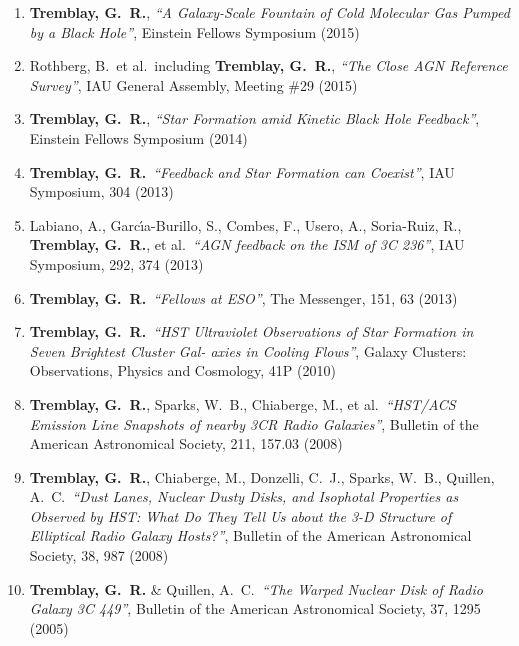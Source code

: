 \documentclass[11pt]{article}
\begin{document}
\begin{enumerate}
\item {\bf Tremblay, G.~R.}, {\it ``A Galaxy-Scale Fountain of Cold Molecular Gas Pumped by a Black Hole''}, Einstein Fellows Symposium (2015)

\item Rothberg, B.~et al.~including {\bf Tremblay, G.~R.}, {\it ``The Close AGN Reference Survey''}, IAU General Assembly, Meeting \#29 (2015) 


\item {\bf Tremblay, G.~R.}, {\it ``Star Formation amid Kinetic Black Hole Feedback''}, Einstein Fellows Symposium (2014)


\item {\bf Tremblay, G.~R.}\  {\it ``Feedback and Star Formation can Coexist''}, 
IAU Symposium, 304 (2013)


\item Labiano, A., Garc{\'{\i}}a-Burillo, S., Combes, F., Usero, A.,  Soria-Ruiz, R.,  {\bf Tremblay, G.~R.}, et al.\ {\it ``AGN feedback on the ISM of 3C 236''}, 
IAU Symposium, 292, 374 (2013)


\item {\bf Tremblay, G.~R.}\  {\it ``Fellows at ESO''}, 
The Messenger, 151, 63 (2013)


\item {\bf Tremblay, G.~R.}\ {\it ``HST Ultraviolet Observations of Star Formation in Seven Brightest Cluster Gal- axies in Cooling Flows''}, 
Galaxy Clusters: Observations, Physics and Cosmology, 41P (2010)


\item {\bf Tremblay, G.~R.}, Sparks, W.~B., Chiaberge, M., et al.\ {\it ``HST/ACS Emission Line Snapshots of nearby 3CR Radio Galaxies''}, 
Bulletin of the American Astronomical Society, 211, 157.03 (2008)



\item {\bf Tremblay, G.~R.}, Chiaberge, M., Donzelli, C.~J., Sparks, W.~B., Quillen, A.~C.\ {\it ``Dust Lanes, Nuclear Dusty Disks, and Isophotal Properties as Observed by HST: What Do They Tell Us about the 3-D Structure of Elliptical Radio Galaxy Hosts?''}, 
Bulletin of the American Astronomical Society, 38, 987 (2008)


\item {\bf Tremblay, G.~R.} \& Quillen, A.~C.\ {\it ``The Warped Nuclear Disk of Radio Galaxy 3C 449''}, 
Bulletin of the American Astronomical Society, 37, 1295 (2005)

\end{enumerate}
\end{document}
